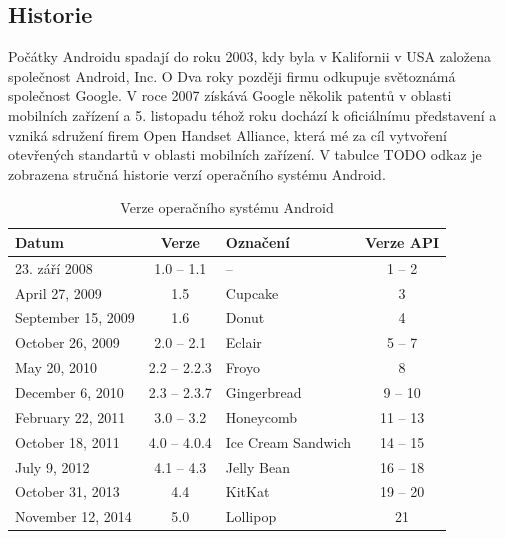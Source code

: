 \subsection{Historie}
Počátky Androidu spadají do roku 2003, kdy byla v Kalifornii v USA založena společnost Android, Inc. O Dva roky později firmu odkupuje světoznámá společnost Google. V roce 2007 získává Google několik patentů v oblasti mobilních zařízení a 5. listopadu téhož roku dochází k oficiálnímu představení a vzniká sdružení firem Open Handset Alliance, která mé za cíl vytvoření otevřených standartů v oblasti mobilních zařízení. V tabulce TODO odkaz je zobrazena stručná historie verzí operačního systému Android.

\begin {table}[h!]
\begin{tabular}{|l|c|l|c|}
\hline
{\bf Datum}         & {\bf Verze}   & {\bf Označení}        & {\bf Verze API}   \\
\hline \hline
23. září 2008       & 1.0 -- 1.1    & --                    & 1 -- 2            \\
\hline
April 27, 2009      & 1.5           & Cupcake               & 3                 \\
\hline
September 15, 2009  & 1.6           & Donut                 & 4                 \\
\hline
October 26, 2009    & 2.0 -- 2.1    & Eclair                & 5 -- 7            \\
\hline
May 20, 2010        & 2.2 -- 2.2.3  & Froyo                 & 8                 \\
\hline
December 6, 2010    & 2.3 -- 2.3.7  & Gingerbread           & 9 -- 10           \\
\hline
February 22, 2011   & 3.0 -- 3.2    & Honeycomb             & 11 -- 13          \\
\hline
October 18, 2011    & 4.0 -- 4.0.4  & Ice Cream Sandwich    & 14 -- 15          \\
\hline
July 9, 2012        & 4.1 -- 4.3    & Jelly Bean            & 16 -- 18          \\
\hline
October 31, 2013    & 4.4           & KitKat                & 19 -- 20          \\
\hline
November 12, 2014   & 5.0           & Lollipop              & 21                \\
\hline
\end{tabular}
\centering
\caption{Verze operačního systému Android}
\end{table}

